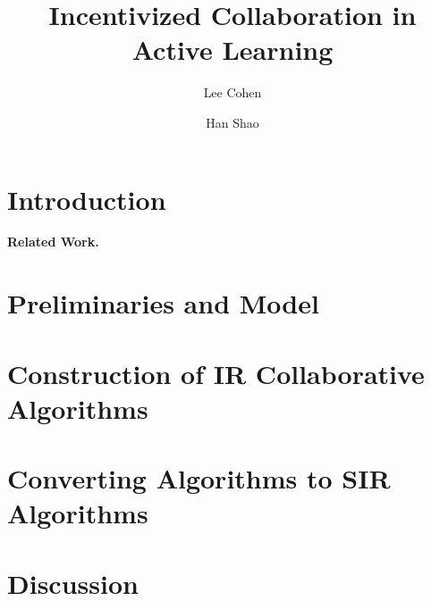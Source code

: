 \documentclass{article}
\title{Incentivized Collaboration in Active Learning}
\author[]{Lee Cohen}
\author[]{Han Shao}
\affil[]{Toyota Technological Institute of Chicago\\
{ \texttt{\{lee, han\}@ttic.edu}}}
\date{}
\begin{document}
\maketitle


\begin{abstract}

\end{abstract}


\section{Introduction}\label{sec:intro}


\textbf{Related Work.}



\section{ Preliminaries and Model}\label{sec:model}


\section{Construction of IR Collaborative Algorithms}\label{sec:ir}


\section{Converting  Algorithms to SIR Algorithms}\label{sec:sir}


\section{Discussion}\label{sec:discussion}






\newpage
\appendix






\end{document}
